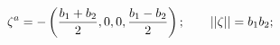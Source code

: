 \begin{equation}
\zeta^a = -\left({b_1+b_2\over2},0,0, {b_1-b_2\over2}\right); 
\qquad
||\zeta|| = b_1 b_2;
\end{equation}

